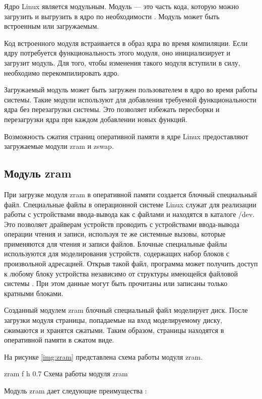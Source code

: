 Ядро Linux является модульным. Модуль --- это часть кода, которую можно загрузить и выгрузить в ядро по необходимости \cite{module}. Модуль может быть встроенным или загружаемым.

Код встроенного модуля встраивается в образ ядра во время компиляции. Если ядру потребуется функциональность этого модуля, оно инициализирует и загрузит модуль. Для того, чтобы изменения такого модуля вступили в силу, необходимо перекомпилировать ядро.

Загружаемый модуль может быть загружен пользователем в ядро во время работы системы. Такие модули используют для добавления требуемой функциональности ядра без перезагрузки системы. Это позволяет избежать пересборки и перезагрузки ядра при каждом добавлении новых функций. 

Возможность сжатия страниц оперативной памяти в ядре Linux предоставляют загружаемые модули zram и zswap.

\subsection{Модуль zram}

При загрузке модуля zram в оперативной памяти создается блочный специальный файл. Специальные файлы в операционной системе Linux служат для реализации работы с устройствами ввода-вывода как с файлами и находятся в каталоге /dev. Это позволяет драйверам устройств проводить с устройствами ввода-вывода операции чтения и записи, используя те же системные
вызовы, которые применяются для чтения и записи файлов. Блочные специальные файлы используются для моделирования устройств, содержащих набор блоков с произвольной адресацией. Открыв такой файл, программа может получить доступ к любому блоку устройства независимо от структуры имеющейся файловой системы \cite{block-file}. При этом данные могут быть прочитаны или записаны только кратными блоками.

Созданный модулем zram блочный специальный файл моделирует диск. После загрузки модуля страницы, попадаемые на вход моделируемому диску, сжимаются и хранятся сжатыми. Таким образом, страницы находятся в оперативной памяти в сжатом виде.

На рисунке \ref{img:zram} представлена схема работы модуля zram.

    {zram}
    {f}
    {h}
    {0.7\textwidth}
    {Схема работы модуля zram}

Модуль zram дает следующие преимущества \cite{zram}:

